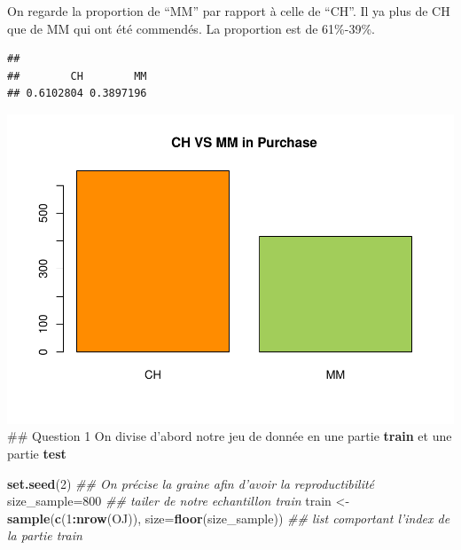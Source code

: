 \documentclass[]{article}
\newenvironment{Shaded}{\begin{snugshade}}{\end{snugshade}}
\newcommand{\CommentTok}[1]{\textcolor[rgb]{0.56,0.35,0.01}{\textit{#1}}}
\newcommand{\DataTypeTok}[1]{\textcolor[rgb]{0.13,0.29,0.53}{#1}}
\newcommand{\DecValTok}[1]{\textcolor[rgb]{0.00,0.00,0.81}{#1}}
\newcommand{\KeywordTok}[1]{\textcolor[rgb]{0.13,0.29,0.53}{\textbf{#1}}}
\newcommand{\NormalTok}[1]{#1}
\newcommand{\OperatorTok}[1]{\textcolor[rgb]{0.81,0.36,0.00}{\textbf{#1}}}
\newcommand{\StringTok}[1]{\textcolor[rgb]{0.31,0.60,0.02}{#1}}
\begin{document}
On regarde la proportion de ``MM'' par rapport à celle de ``CH''. Il ya
plus de CH que de MM qui ont été commendés. La proportion est de
61\%-39\%.

\begin{Shaded}
\end{Shaded}

\begin{verbatim}
## 
##        CH        MM 
## 0.6102804 0.3897196
\end{verbatim}

\begin{Shaded}
\end{Shaded}

\includegraphics{durand_eltarr_files/figure-latex/unnamed-chunk-7-1.pdf}
\#\# Question 1 On divise d'abord notre jeu de donnée en une partie
\textbf{train} et une partie \textbf{test}

\begin{Shaded}
\begin{Highlighting}[]
\KeywordTok{set.seed}\NormalTok{(}\DecValTok{2}\NormalTok{) }\CommentTok{## On précise la graine afin d'avoir la reproductibilité}
\NormalTok{size_sample=}\DecValTok{800} \CommentTok{## tailer de notre echantillon train}
\NormalTok{train <-}\StringTok{ }\KeywordTok{sample}\NormalTok{(}\KeywordTok{c}\NormalTok{(}\DecValTok{1}\OperatorTok{:}\KeywordTok{nrow}\NormalTok{(OJ)), }\DataTypeTok{size=}\KeywordTok{floor}\NormalTok{(size_sample)) }\CommentTok{## list comportant l'index de la partie train}
\end{Highlighting}
\end{Shaded}
\end{document}
